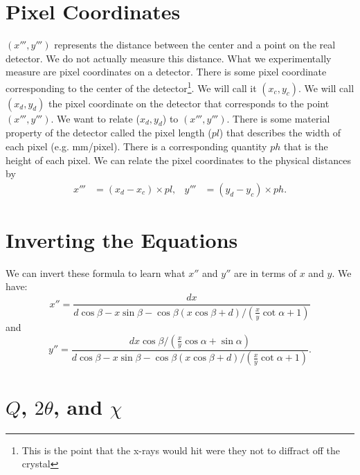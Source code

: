 \section{Pixel Coordinates}

$(x''',y''')$ represents the distance between the center 
and a point on the real detector. We do not actually
measure this distance. What we experimentally measure
are pixel coordinates on a detector. There is some pixel 
coordinate corresponding to the center of
the detector\footnote{This is the point that the x-rays would
hit were they not to diffract off the crystal}. We will call 
it $(x_c,y_c)$.  We will call $(x_d,y_d)$ the 
pixel coordinate on the detector
that corresponds to the point $(x''',y''')$.
We want to relate ($x_d,y_d$) to $(x''',y''')$.
There is some material property of the detector 
called the pixel length ($pl$) that describes the width of each pixel
(e.g. \unit[1000]{mm/pixel}). There is a corresponding
quantity $ph$ that is the height of each pixel.
We can relate the pixel coordinates to the physical distances
by
\begin{align}\label{conversionToPixels}
    x'''&=(x_d-x_c) \times pl, &
    y'''&=(y_d-y_c) \times ph.
\end{align}

\section{Inverting the Equations}

We can invert these formula to learn what
$x''$ and $y''$ are in terms of $x$ and $y$.
We have:
\begin{equation}\label{invertx}
    x''=\frac{dx}{d\cos\beta-x\sin\beta-
    \cos\beta(x\cos\beta+d)/(\tfrac{x}{y}\cot\alpha+1)}
\end{equation}
and
\begin{equation}\label{inverty}
    y''=\frac{dx\cos\beta/(\tfrac{x}{y}\cos\alpha+\sin\alpha)}
    {d\cos\beta-x\sin\beta-
    \cos\beta(x\cos\beta+d)/(\tfrac{x}{y}\cot\alpha+1)}.
\end{equation}

\section{\texorpdfstring{$Q$, $2\theta$, and $\chi$}{Q, 2theta, and chi}}

